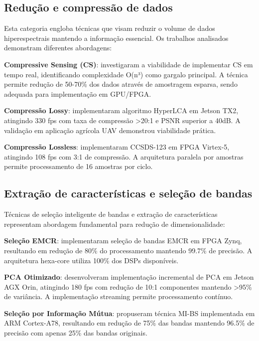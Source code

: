 \subsection{Redução e compressão de dados}\label{subsec:reducao_compressao}

Esta categoria engloba técnicas que visam reduzir o volume de dados hiperespectrais mantendo a informação essencial. Os trabalhos analisados demonstram diferentes abordagens:

\textbf{Compressive Sensing (CS)}: \textcite{Lim2022} investigaram a viabilidade de implementar CS em tempo real, identificando complexidade O(n³) como gargalo principal. A técnica permite redução de 50-70\% dos dados através de amostragem esparsa, sendo adequada para implementação em GPU/FPGA.

\textbf{Compressão Lossy}: \textcite{Diaz2019} implementaram algoritmo HyperLCA em Jetson TX2, atingindo 330 fps com taxa de compressão >20:1 e PSNR superior a 40dB. A validação em aplicação agrícola UAV demonstrou viabilidade prática.

\textbf{Compressão Lossless}: \textcite{Barrios2019} implementaram CCSDS-123 em FPGA Virtex-5, atingindo 108 fps com 3:1 de compressão. A arquitetura paralela por amostras permite processamento de 16 amostras por ciclo.

\subsection{Extração de características e seleção de bandas}\label{subsec:extracao_selecao}

Técnicas de seleção inteligente de bandas e extração de características representam abordagem fundamental para redução de dimensionalidade:

\textbf{Seleção EMCR}: \textcite{Martins2019} implementaram seleção de bandas EMCR em FPGA Zynq, resultando em redução de 80\% do processamento mantendo 99.7\% de precisão. A arquitetura hexa-core utiliza 100\% dos DSPs disponíveis.

\textbf{PCA Otimizado}: \textcite{Wu2023} desenvolveram implementação incremental de PCA em Jetson AGX Orin, atingindo 180 fps com redução de 10:1 componentes mantendo >95\% de variância. A implementação streaming permite processamento contínuo.

\textbf{Seleção por Informação Mútua}: \textcite{Wang2024} propuseram técnica MI-BS implementada em ARM Cortex-A78, resultando em redução de 75\% das bandas mantendo 96.5\% de precisão com apenas 25\% das bandas originais.

